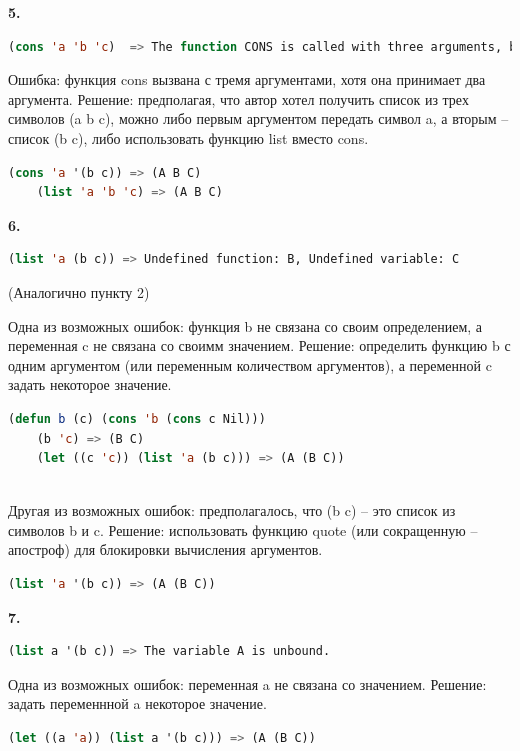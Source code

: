 \documentclass[12pt]{report}
\begin{document}
\textbf{5.}

\begin{lstlisting}[language=Lisp]
	(cons 'a 'b 'c)  => The function CONS is called with three arguments, but wants exactly two.
\end{lstlisting}

Ошибка: функция cons вызвана с тремя аргументами, хотя она принимает два аргумента. Решение: предполагая, что автор хотел получить список из трех символов  (a b c), можно либо первым аргументом передать символ a, а вторым -- список (b c), либо использовать функцию list вместо cons.


\begin{lstlisting}[language=Lisp]
	(cons 'a '(b c)) => (A B C)
	(list 'a 'b 'c) => (A B C)
\end{lstlisting}




\textbf{6.} 
\begin{lstlisting}[language=Lisp]
	(list 'a (b c)) => Undefined function: B, Undefined variable: C
\end{lstlisting}

(Аналогично пункту 2)

Одна из возможных ошибок: функция b не связана со своим определением, а переменная c не связана со своимм значением. Решение: определить функцию b с одним аргументом (или переменным количеством аргументов), а переменной c задать некоторое значение.
\begin{lstlisting}[language=Lisp]
	(defun b (c) (cons 'b (cons c Nil)))
	(b 'c) => (B C)
	(let ((c 'c)) (list 'a (b c))) => (A (B C))
	
\end{lstlisting}

Другая из возможных ошибок: предполагалось, что (b c) -- это список из символов b и c. Решение: использовать функцию quote (или сокращенную -- апостроф) для блокировки вычисления аргументов.
\begin{lstlisting}[language=Lisp]
	(list 'a '(b c)) => (A (B C))
\end{lstlisting}







\textbf{7.} 
\begin{lstlisting}[language=Lisp]
	(list a '(b c)) => The variable A is unbound.
\end{lstlisting}

Одна из возможных ошибок: переменная a не связана со значением. Решение: задать переменнной a некоторое значение.
\begin{lstlisting}[language=Lisp]
	(let ((a 'a)) (list a '(b c))) => (A (B C))
\end{lstlisting}
\end{document}

